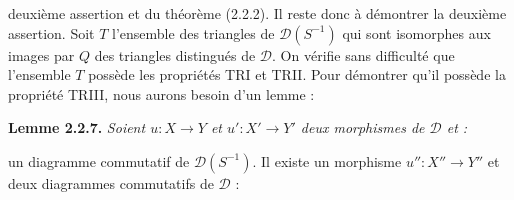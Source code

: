 \clearpage
{}%
\begingroup
\normalsize
\setlength{\parskip}{0pt}%
\setlength{\emergencystretch}{1.5em}%
\setlength{\abovedisplayskip}{1pt plus 1pt minus 1pt}%
\setlength{\belowdisplayskip}{1pt plus 1pt minus 1pt}%

\noindent deuxième assertion et du théorème (2.2.2). Il reste donc à démontrer
la deuxième assertion.
%
Soit $T$ l'ensemble des triangles de $\mathcal D(S^{-1})$ qui sont
isomorphes aux images par $Q$ des triangles distingués de $\mathcal D$.
%
On vérifie sans difficulté que l'ensemble $T$ possède les propriétés TRI et
TRII. Pour démontrer qu'il possède la propriété TRIII, nous aurons besoin
d'un lemme :

\smallskip
\noindent\textbf{Lemme 2.2.7.}\quad
\begingroup\itshape
Soient $u\colon X\longrightarrow Y$ et
$u'\colon X'\longrightarrow Y'$ deux morphismes de $\mathcal D$ et :

\begin{center}
\end{center}

\noindent un diagramme commutatif de $\mathcal D(S^{-1})$.
%
Il existe un morphisme $u''\colon X''\longrightarrow Y''$ et deux diagrammes
commutatifs de $\mathcal D$ :

